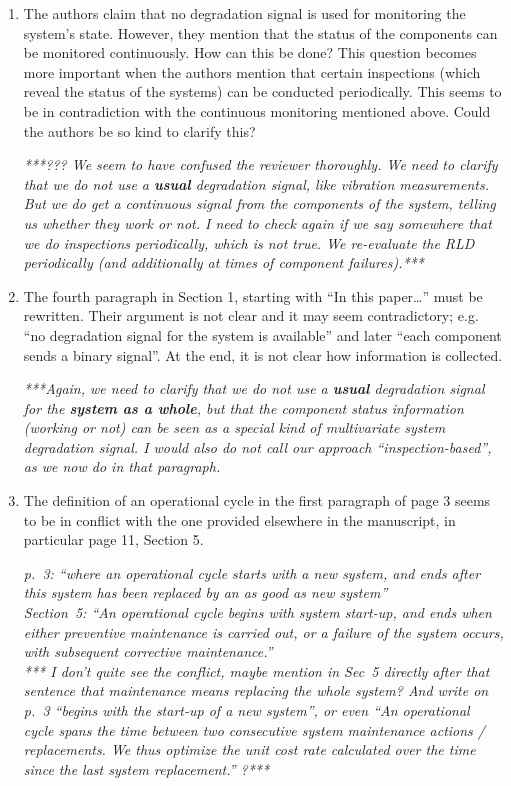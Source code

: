 \documentclass[authoryear]{elsarticle}
\begin{document}
\begin{enumerate}
\item The authors claim that no degradation signal is used for monitoring the system’s state. However, they mention that the status of the components can be monitored continuously. How can this be done? This question becomes more important when the authors mention that certain inspections (which reveal the status of the systems) can be conducted periodically. This seems to be in contradiction with the continuous monitoring mentioned above. Could the authors be so kind to clarify this?

\smallskip

\emph{***??? We seem to have confused the reviewer thoroughly.
We need to clarify that we do not use a \textbf{usual} degradation signal, like vibration measurements.
But we do get a continuous signal from the components of the system, telling us whether they work or not.
I need to check again if we say somewhere that we do inspections periodically, which is not true.
We re-evaluate the RLD periodically (and additionally at times of component failures).***}

\item The fourth paragraph in Section 1, starting with “In this paper…” must be rewritten. Their argument is not clear and it may seem contradictory; e.g. “no degradation signal for the system is available” and later “each component sends a binary signal”. At the end, it is not clear how information is collected.

\smallskip

\emph{***Again, we need to clarify that we do not use a \textbf{usual} degradation signal for the \textbf{system as a whole},
but that the component status information (working or not) can be seen as a special kind of multivariate system degradation signal.
I would also do not call our approach ``inspection-based'', as we now do in that paragraph.}

\item The definition of an operational cycle in the first paragraph of page 3 seems to be in conflict with the one provided elsewhere in the manuscript, in particular page 11, Section 5.

\smallskip

\emph{p.~3: ``where an operational cycle starts with a new system,
and ends after this system has been replaced by an as good as new system''\\
Section~5: ``An operational cycle begins with system start-up,
and ends when either preventive maintenance is carried out, or a failure of the system occurs,
with subsequent corrective maintenance.''\\
*** I don't quite see the conflict, maybe mention in Sec~5 directly after that sentence that maintenance means replacing the whole system?
And write on p.~3 ``begins with the start-up of a new system'', or even
``An operational cycle spans the time between two consecutive system maintenance actions / replacements.
We thus optimize the unit cost rate calculated over the time since the last system replacement.''
?***}


\end{enumerate}
\end{document}
